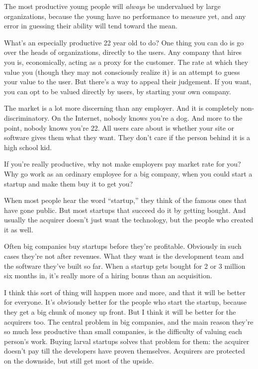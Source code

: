 \documentclass[12pt]{book}
\begin{document}
The most productive young people will \emph{always} be undervalued by
large organizations, because the young have no performance to measure
yet, and any error in guessing their ability will tend toward the mean.

What's an especially productive 22 year old to do? One thing you can do
is go over the heads of organizations, directly to the users. Any
company that hires you is, economically, acting as a proxy for the
customer. The rate at which they value you (though they may not
consciously realize it) is an attempt to guess your value to the user.
But there's a way to appeal their judgement. If you want, you can opt to
be valued directly by users, by starting your own company.

The market is a lot more discerning than any employer. And it is
completely non-discriminatory. On the Internet, nobody knows you're a
dog. And more to the point, nobody knows you're 22. All users care about
is whether your site or software gives them what they want. They don't
care if the person behind it is a high school kid.

If you're really productive, why not make employers pay market rate for
you? Why go work as an ordinary employee for a big company, when you
could start a startup and make them buy it to get you?

When most people hear the word ``startup,'' they think of the famous
ones that have gone public. But most startups that succeed do it by
getting bought. And usually the acquirer doesn't just want the
technology, but the people who created it as well.

Often big companies buy startups before they're profitable. Obviously in
such cases they're not after revenues. What they want is the development
team and the software they've built so far. When a startup gets bought
for 2 or 3 million six months in, it's really more of a hiring bonus
than an acquisition.

I think this sort of thing will happen more and more, and that it will
be better for everyone. It's obviously better for the people who start
the startup, because they get a big chunk of money up front. But I think
it will be better for the acquirers too. The central problem in big
companies, and the main reason they're so much less productive than
small companies, is the difficulty of valuing each person's work. Buying
larval startups solves that problem for them: the acquirer doesn't pay
till the developers have proven themselves. Acquirers are protected on
the downside, but still get most of the upside.
\end{document}
